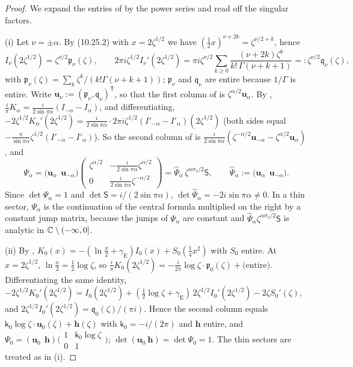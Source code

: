 \begin{proof}
We expand the entries of \cite[(6.23)]{KMVV} by the power series \cite[(10.25.2)]{DLMF} and read off the singular factors.

(i) Let $\nu=\pm\alpha$. By (10.25.2) with $x=2\zeta^{1/2}$ we have $(\frac12x)^{\nu+2k}=\zeta^{\nu/2+k}$, hence
\[
  I_\nu(2\zeta^{1/2})=\zeta^{\nu/2}\mathfrak p_\nu(\zeta),\qquad
  2\pi i\zeta^{1/2}I_\nu'(2\zeta^{1/2})=\pi i\zeta^{\nu/2}\sum_{k\ge0}\frac{(\nu+2k)\zeta^k}{k!\,\Gamma(\nu+k+1)}
  =:\zeta^{\nu/2}\mathfrak q_\nu(\zeta),
\]
with $\mathfrak p_\nu(\zeta)=\sum_k\zeta^k/(k!\Gamma(\nu+k+1))$; $\mathfrak p_\nu$ and $\mathfrak q_\nu$ are entire because $1/\Gamma$ is entire.
Write $\mathbf u_\nu:=(\mathfrak p_\nu,\mathfrak q_\nu)^{\mathsf T}$, so that the first column of \cite[(6.23)]{KMVV} is $\zeta^{\alpha/2}\mathbf u_\alpha$. By \cite[(10.27.4)]{DLMF},
$\frac i\pi K_\alpha=\frac{i}{2\sin\pi\alpha}(I_{-\alpha}-I_\alpha)$, and differentiating,
$-2\zeta^{1/2}K_\alpha'(2\zeta^{1/2})=\frac{i}{2\sin\pi\alpha}\cdot2\pi i\zeta^{1/2}(I'_{-\alpha}-I'_\alpha)(2\zeta^{1/2})$
(both sides equal $-\frac{\pi}{\sin\pi\alpha}\zeta^{1/2}(I'_{-\alpha}-I'_\alpha)$). So the second column of \cite[(6.23)]{KMVV} is
$\frac{i}{2\sin\pi\alpha}(\zeta^{-\alpha/2}\mathbf u_{-\alpha}-\zeta^{\alpha/2}\mathbf u_\alpha)$, and
\[
  \Psi_\alpha=\bigl(\mathbf u_\alpha\ \ \mathbf u_{-\alpha}\bigr)\begin{pmatrix}\zeta^{\alpha/2}&-\frac{i}{2\sin\pi\alpha}\zeta^{\alpha/2}\\
  0&\frac{i}{2\sin\pi\alpha}\zeta^{-\alpha/2}\end{pmatrix}=\hat\Psi_\alpha\,\zeta^{\alpha\sigma_3/2}\mathsf S,\qquad
  \hat\Psi_\alpha:=\bigl(\mathbf u_\alpha\ \ \mathbf u_{-\alpha}\bigr).
\]
Since $\det\Psi_\alpha=1$ and $\det\mathsf S=i/(2\sin\pi\alpha)$, $\det\hat\Psi_\alpha=-2i\sin\pi\alpha\ne0$. In a thin
sector, $\Psi_\alpha$ is the continuation of the central formula multiplied on the right by a constant jump matrix,
because the jumps of $\Psi_\alpha$ are constant and $\hat\Psi_\alpha\zeta^{\alpha\sigma_3/2}\mathsf S$ is analytic in
$\mathbb{C}\setminus(-\infty,0]$.

(ii) By \cite[(10.31.2)]{DLMF}, $K_0(x)=-(\ln\frac x2+\gamma_{\mathrm E})I_0(x)+S_0(\frac14x^2)$ with $S_0$ entire. At $x=2\zeta^{1/2}$,
$\ln\frac x2=\frac12\log\zeta$, so $\frac i\pi K_0(2\zeta^{1/2})=-\frac{i}{2\pi}\log\zeta\cdot \mathfrak p_0(\zeta)+\text{(entire)}$.
Differentiating the same identity, $-2\zeta^{1/2}K_0'(2\zeta^{1/2})=I_0(2\zeta^{1/2})+(\frac12\log\zeta+\gamma_{\mathrm E})\,
2\zeta^{1/2}I_0'(2\zeta^{1/2})-2\zeta S_0'(\zeta)$, and $2\zeta^{1/2}I_0'(2\zeta^{1/2})=\mathfrak q_0(\zeta)/(\pi i)$. Hence the
second column equals $\mathsf k_0\log\zeta\cdot\mathbf u_0(\zeta)+\mathbf h(\zeta)$ with $\mathsf k_0=-i/(2\pi)$ and $\mathbf h$ entire, and
$\Psi_0=(\mathbf u_0\ \ \mathbf h)\bigl(\begin{smallmatrix}1&\mathsf k_0\log\zeta\\0&1\end{smallmatrix}\bigr)$; $\det(\mathbf u_0\ \mathbf h)=\det\Psi_0=1$.
The thin sectors are treated as in (i).


\end{proof}

